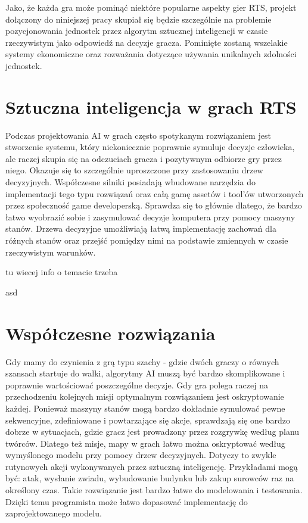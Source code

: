 \documentclass[12pt]{report}
\begin{document}
Jako, że każda gra może pominąć niektóre popularne aspekty gier RTS, projekt dołączony do niniejszej pracy skupiał się będzie szczególnie na problemie pozycjonowania jednostek przez algorytm sztucznej inteligencji w czasie rzeczywistym jako odpowiedź na decyzje gracza. Pominięte zostaną wszelakie systemy ekonomiczne oraz rozważania dotyczące używania unikalnych zdolności jednostek.
\section {Sztuczna inteligencja w grach RTS}
Podczas projektowania AI w grach często spotykanym rozwiązaniem jest stworzenie systemu, który niekoniecznie poprawnie symuluje decyzje człowieka, ale raczej skupia się na odczuciach gracza i pozytywnym odbiorze gry przez niego. Okazuje się to szczególnie uproszczone przy zastosowaniu drzew decyzyjnych. Współczesne silniki posiadają wbudowane narzędzia do implementacji tego typu rozwiązań oraz całą gamę assetów i tool'ów utworzonych przez społeczność game developerską. Sprawdza się to głównie dlatego, że bardzo łatwo wyobrazić sobie i zasymulować decyzje komputera przy pomocy maszyny stanów. Drzewa decyzyjne umożliwiają łatwą implementację zachowań dla różnych stanów oraz przejść pomiędzy nimi na podstawie zmiennych w czasie rzeczywistym warunków. 


tu wiecej info o temacie trzeba


asd
\section {Współczesne rozwiązania} 
Gdy mamy do czynienia z grą typu szachy - gdzie dwóch graczy o równych szansach startuje do walki, algorytmy AI muszą być bardzo skomplikowane i poprawnie wartościować poszczególne decyzje. Gdy gra polega raczej na przechodzeniu kolejnych misji optymalnym rozwiązaniem jest oskryptowanie każdej. Ponieważ maszyny stanów mogą bardzo dokładnie symulować pewne sekwencyjne, zdefiniowane i powtarzające się akcje, sprawdzają się one bardzo dobrze w sytuacjach, gdzie gracz jest prowadzony przez rozgrywkę według planu twórców. Dlatego też misje, mapy w grach łatwo można oskryptować według wymyślonego modelu przy pomocy drzew decyzyjnych. Dotyczy to zwykle rutynowych akcji wykonywanych przez sztuczną inteligencję. Przykładami mogą być: atak, wysłanie zwiadu, wybudowanie budynku lub zakup surowców raz na określony czas. Takie rozwiązanie jest bardzo łatwe do modelowania i testowania. Dzięki temu programista może łatwo dopasować implementację do zaprojektowanego modelu. 
\end{document}
